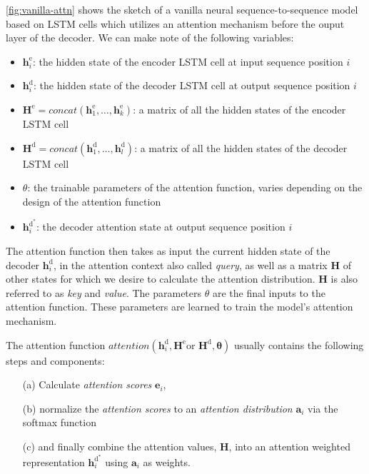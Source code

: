 \documentclass[11pt]{article}
\theoremstyle{definition}
\begin{document}
\autoref{fig:vanilla-attn} shows the sketch of a vanilla neural sequence-to-sequence model based on LSTM cells which utilizes an attention mechanism before the ouput layer of the decoder. We can make note of the following variables:
\begin{itemize}
	\item $\mathbf{h}^{\text{e}}_i$: the hidden state of the encoder LSTM cell at input sequence position $i$
	\item $\mathbf{h}^{\text{d}}_i$: the hidden state of the decoder LSTM cell at output sequence position $i$
	\item $\mathbf{H}^{\text{e}} = concat(\mathbf{h}^{\text{e}}_1,\dots ,\mathbf{h}^{\text{e}}_k)$: a matrix of all the hidden states of the encoder LSTM cell
	\item $\mathbf{H}^{\text{d}} = concat(\mathbf{h}^{\text{d}}_1,\dots ,\mathbf{h}^{\text{d}}_l)$: a matrix of all the hidden states of the decoder LSTM cell
	\item $\theta$: the trainable parameters of the attention function, varies depending on the design of the attention function
	\item $\mathbf{h}^{\text{d}^*}_i$: the decoder attention state at output sequence position $i$
\end{itemize}
The attention function then takes as input the current hidden state of the decoder $\mathbf{h}^{\text{d}}_i$, in the attention context also called \textit{query}, as well as a matrix $\mathbf{H}$ of other states for which we desire to calculate the attention distribution. $\mathbf{H}$ is also referred to as \textit{key} and \textit{value}. The parameters $\theta$ are the final inputs to the attention function. These parameters are learned to train the model's attention mechanism.
\par
The attention function $attention(\mathbf{h}^{\text{d}}_i, \mathbf{H}^{\text{e}} \text{or } \mathbf{H}^{\text{d}}, \mathbf{\theta})$ usually contains the following steps and components:
\begin{itemize}
	\item[(a)] Calculate \textit{attention scores} $\mathbf{e}_i$,
	\item[(b)] normalize the \textit{attention scores} to an \textit{attention distribution} $\mathbf{a}_i$ via the softmax function
	\item[(c)] and finally combine the attention values, $\mathbf{H}$, into an attention weighted representation $\mathbf{h}^{\text{d}^*}_i$ using $\mathbf{a}_i$ as weights.
\end{itemize}
\end{document}
